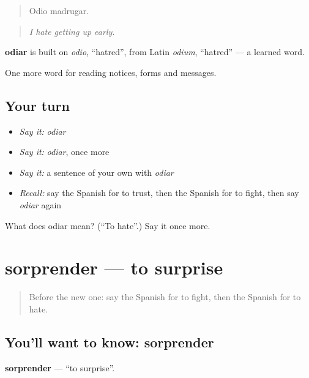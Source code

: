 \begin{quote}
Odio madrugar.
\end{quote}

\begin{quote}
\emph{I hate getting up early.}
\end{quote}

\begin{cousinweb}
\textbf{odiar} is built on \emph{odio}, \textquotedblleft{}hatred\textquotedblright{}, from Latin \emph{odium}, \textquotedblleft{}hatred\textquotedblright{} — a learned word.
\end{cousinweb}

\begin{grammarlens}[title={What you've built}]
One more word for reading notices, forms and messages.
\end{grammarlens}

\subsection*{Your turn}
\begin{itemize}
\raggedright
  \item \emph{Say it:} \emph{odiar}
  \item \emph{Say it:} \emph{odiar}, once more
  \item \emph{Say it:} a sentence of your own with \emph{odiar}
  \item \emph{Recall:} say the Spanish for to trust, then the Spanish for to fight, then say \emph{odiar} again
\end{itemize}

\begin{tcolorbox}[breakable,colback=teal!4,colframe=teal!35!black,title={Before you move on}]
What does odiar mean? (\textquotedblleft{}To hate\textquotedblright{}.) Say it once more.
\end{tcolorbox}
\section[sorprender]{sorprender — to surprise}

\label{lesson:ES-C510-sorprender}



\begin{quote}
Before the new one: say the Spanish for to fight, then the Spanish for to hate.
\end{quote}

\subsection*{You'll want to know: sorprender}
\textbf{sorprender} — \textquotedblleft{}to surprise\textquotedblright{}.

